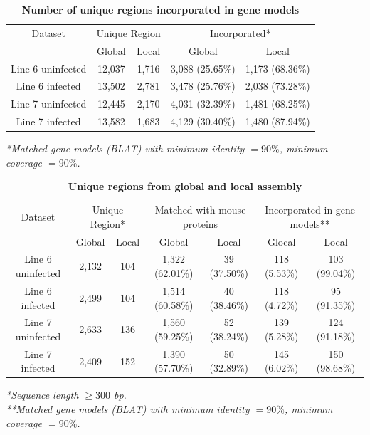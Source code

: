 \documentclass[10pt]{article}
\begin{document}
\begin{table}[!ht]
\caption{
\bf{Number of unique regions incorporated in gene models}}
\begin{tabular}{ccccc}
\hline
Dataset & \multicolumn{2}{c}{Unique Region} & \multicolumn{2}{c}{Incorporated*}\\
 & Global & Local & Global & Local\\
\hline
Line 6 uninfected & 12,037 & 1,716 & 3,088 (25.65\%) & 1,173 (68.36\%) \\
Line 6 infected & 13,502 & 2,781 & 3,478 (25.76\%) & 2,038 (73.28\%) \\
Line 7 uninfected & 12,445 & 2,170 & 4,031 (32.39\%) & 1,481 (68.25\%) \\
Line 7 infected & 13,582 & 1,683 & 4,129 (30.40\%) & 1,480 (87.94\%) \\
\hline
\end{tabular}
\begin{flushleft}\footnotesize \textit{*Matched gene models (BLAT) with
minimum identity $=90\%$, minimum coverage $=90\%$.}
\end{flushleft}
\label{uniq_regions}
\end{table}

\begin{table}[!ht]
\caption{
\bf{Unique regions from global and local assembly}}
\begin{tabular}{ccccccc}
\hline
Dataset & \multicolumn{2}{c}{Unique Region*} & \multicolumn{2}{c}{Matched with mouse proteins} & \multicolumn{2}{c}{Incorporated in gene models**}\\
 & Global & Local & Global & Local & Glocal & Local\\
\hline
Line 6 uninfected & 2,132 & 104 & 1,322 (62.01\%) & 39 (37.50\%) & 118 (5.53\%) & 103 (99.04\%) \\
Line 6 infected & 2,499 & 104 & 1,514 (60.58\%)& 40 (38.46\%) & 118 (4.72\%) & 95 (91.35\%) \\
Line 7 uninfected & 2,633 & 136 & 1,560 (59.25\%) & 52 (38.24\%) & 139 (5.28\%) & 124 (91.18\%) \\
Line 7 infected & 2,409 & 152 & 1,390 (57.70\%)& 50 (32.89\%) & 145 (6.02\%) & 150 (98.68\%) \\
\hline
\end{tabular}
\label{unique_sequences_matched_mouse}
\begin{flushleft}\footnotesize \textit{*Sequence length $\ge300$ bp.\\
**Matched gene models (BLAT) with minimum identity $=90\%$,
minimum coverage $=90\%$.}
\end{flushleft}
\label{uniq_regions}
\end{table}
\end{document}

